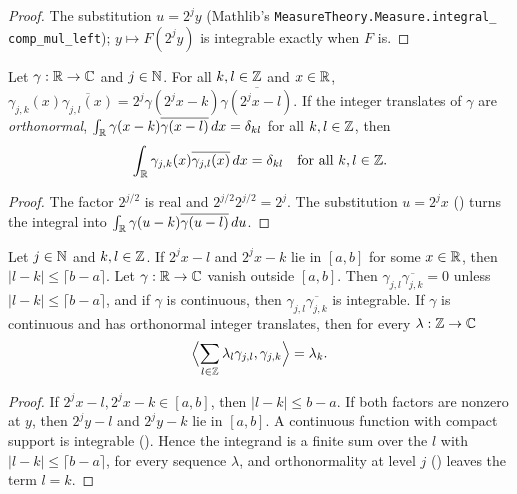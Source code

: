 \begin{proof}
\leanok
The substitution $u = 2^j y$ (Mathlib's
\texttt{MeasureTheory.\allowbreak Measure.\allowbreak integral\_\allowbreak
comp\_\allowbreak mul\_\allowbreak left});
$y \mapsto F(2^j y)$ is integrable exactly when $F$ is.
\end{proof}

\begin{lemma}
\label{lem:daub-generators-orthonormal}
\leanok
{}
Let $\gamma : \mathbb{R} \to \mathbb{C}$ and $j \in \mathbb{N}$. For all $k, l \in \mathbb{Z}$ and $x \in \mathbb{R}$,
$\gamma_{j,k}(x) \overline{\gamma_{j,l}(x)} = 2^j \gamma(2^j x - k) \overline{\gamma(2^j x - l)}$.
If the integer translates of $\gamma$ are \emph{orthonormal},
$\int_{\mathbb{R}} \gamma(x - k) \overline{\gamma(x - l)} \, dx = \delta_{kl}$ for all $k, l \in \mathbb{Z}$, then
\[
  \int_{\mathbb{R}} \gamma_{j,k}(x) \overline{\gamma_{j,l}(x)} \, dx = \delta_{kl}
  \quad\text{for all } k, l \in \mathbb{Z} .
\]
\end{lemma}

\begin{proof}
\leanok
{}
The factor $2^{j/2}$ is real and $2^{j/2} 2^{j/2} = 2^j$. The substitution $u = 2^j x$
() turns the integral into
$\int_{\mathbb{R}} \gamma(u - k) \overline{\gamma(u - l)} \, du$.
\end{proof}

\begin{proposition}
\label{prop:daub-generators-recovery}
\leanok
{}
Let $j \in \mathbb{N}$ and $k, l \in \mathbb{Z}$. If $2^j x - l$ and $2^j x - k$ lie in $[a, b]$ for some
$x \in \mathbb{R}$, then $|l - k| \leq \lceil b - a \rceil$. Let $\gamma : \mathbb{R} \to \mathbb{C}$ vanish outside
$[a, b]$. Then $\gamma_{j,l} \overline{\gamma_{j,k}} = 0$ unless $|l - k| \leq \lceil b - a \rceil$,
and if $\gamma$ is continuous, then $\gamma_{j,l} \overline{\gamma_{j,k}}$ is integrable. If
$\gamma$ is continuous and has orthonormal integer translates, then for every
$\lambda : \mathbb{Z} \to \mathbb{C}$
\[
  \Bigl\langle \sum_{l \in \mathbb{Z}} \lambda_l \gamma_{j,l}, \gamma_{j,k} \Bigr\rangle = \lambda_k .
\]
\end{proposition}

\begin{proof}
\leanok
{}
If $2^j x - l, 2^j x - k \in [a, b]$, then $|l - k| \leq b - a$. If both factors are nonzero at
$y$, then $2^j y - l$ and $2^j y - k$ lie in $[a, b]$. A continuous function with compact
support is integrable (). Hence the integrand is a finite sum over
the $l$ with $|l - k| \leq \lceil b - a \rceil$, for every sequence $\lambda$, and orthonormality
at level $j$ () leaves the term $l = k$.
\end{proof}

